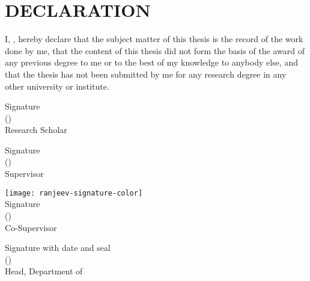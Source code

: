 
\chapter*{DECLARATION}

    \par
    I, \textit{\authorname}, hereby declare that the subject matter of this thesis is the record of the work done by me, that the content of this thesis did not form the basis of the award of any previous degree to me or to the best of my knowledge to anybody else, and that the thesis has not been submitted by me for any research degree in any other university or institute.
    
    \vspace*{15mm}
    \begin{flushleft}
        Signature\\
        (\authorname)\\
        Research Scholar
    \end{flushleft}
    
    \vspace*{15mm}
    \begin{flushleft}
        Signature\\
        (\supervisor)\\
        Supervisor
    \end{flushleft}
    
    \vspace*{5mm}
    \begin{flushleft}
    	\texttt{[image: ranjeev-signature-color]}\vspace{-3mm}\\
        Signature\\
        (\cosupervisor)\\
        Co-Supervisor
    \end{flushleft}
    
    \vspace*{15mm}
    \begin{flushleft}
        Signature with date and seal\\
        (\headofdepartment)\\
        Head, Department of \department
    \end{flushleft}

